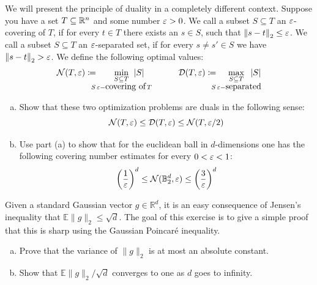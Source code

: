 \begin{myexercise}
    \label{prob:duality_covering_numbers}
    We will present the principle of duality in a completely different context. Suppose you have a set $T \subseteq \mathbb{R}^n$ and some number $\varepsilon>0$. We call a subset $S \subseteq T$ an $\varepsilon$-covering of $T$, if for every $t \in T$ there exists an $s \in S$, such that ${\left\lVert{s-t}\right\rVert}_2 \leq \varepsilon$. We call a subset $S \subseteq T$ an $\varepsilon$-separated set, if for every $s \neq s' \in S$ we have ${\left\lVert{s-t}\right\rVert}_2 > \varepsilon$. We define the following optimal values:
    $$ \mathcal{N}(T, \eps) \coloneqq \hspace{-3mm} \min_{\substack{S \subseteq T \\ S \, \eps-\mbox{covering of} \, T}} \hspace{-8mm} \abs{S}  \qquad \qquad \mathcal{D}(T, \eps) \coloneqq \hspace{-3mm} \max_{\substack{S \subseteq T \\ S \, \eps-\mbox{separated}}} \hspace{-5mm} \abs{S} $$
    \begin{enumerate}[(a)]
        \item Show that these two optimization problems are duals in the following sense:
        $$ \mathcal{N}(T, \varepsilon) \leq \mathcal{D}(T, \varepsilon)  \leq \mathcal{N}(T, \varepsilon/2)  $$
        \item Use part (a) to show that for the euclidean ball in $d$-dimensions one has the following covering number estimates for every $0< \varepsilon < 1$:
        $$ \left( \frac{1}{\varepsilon} \right)^d  \leq  \mathcal{N}(\mathbb{B}_2^d, \varepsilon) \leq \left( \frac{3}{\varepsilon} \right)^d$$
    \end{enumerate}
\end{myexercise}




\begin{myexercise}
    \label{prob:norm_gaussian_vector}
    
    Given a standard Gaussian vector $g \in \mathbb{R}^d$, it is an easy consequence of Jensen's inequality that $\mathbb{E}\|g\|_2 \le \sqrt{d}$. The goal of this exercise is to give a simple proof that this is sharp using the Gaussian Poincaré inequality. 
\begin{enumerate}[(a)]
    \item Prove that the variance of $\|g\|_2$ is at most an absolute constant.
    \item Show that $\mathbb{E}\|g\|_2/\sqrt{d}$ converges to one as $d$ goes to infinity.
\end{enumerate}

\end{myexercise}





